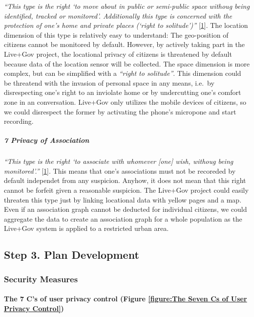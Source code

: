 \emph{``This type is the right `to move about in public or semi-public
space withoug being identified, tracked or monitored'. Additionally this
type is concerned with the protection of one's home and private places
(`right to solitude')''} {[}\hyperref[references]{1}{]}. The location
dimension of this type is relatively easy to understand: The
geo-position of citizens cannot be monitored by default. However, by
actively taking part in the Live+Gov project, the locational privacy of
citizens is threatened by default because data of the location sensor
will be collected. The space dimension is more complex, but can be
simplified with a \emph{``right to solitude''}. This dimension could be
threatend with the invasion of personal space in any means, i.e.~by
disrespecting one's right to an inviolate home or by undercutting one's
comfort zone in an conversation. Live+Gov only utilizes the mobile
devices of citizens, so we could disrespect the former by activating the
phone's micropone and start recording.

\subparagraph{7 Privacy of Association}

\emph{``This type is the right `to associate with whomever {[}one{]}
wish, withoug being monitored'.''} {[}\hyperref[references]{1}{]}. This
means that one's associations must not be recoreded by default
independet from any suspicion. Anyhow, it does not mean that this right
cannot be forfeit given a reasonable suspicion. The Live+Gov project
could easily threaten this type just by linking locational data with
yellow pages and a map. Even if an association graph cannot be deducted
for individual citizens, we could aggregate the data to create an
association graph for a whole population as the Live+Gov system is
applied to a restricted urban area.

\subsection{Step 3. Plan Development}

\subsubsection{Security Measures}

\paragraph{The 7 C's of user privacy control (Figure \ref{figure:The Seven Cs of User Privacy Control})}

